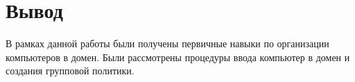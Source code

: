 \chapter{Вывод}

В рамках данной работы были получены первичные навыки по организации компьютеров в домен. Были рассмотрены процедуры ввода компьютер в домен и создания групповой политики.